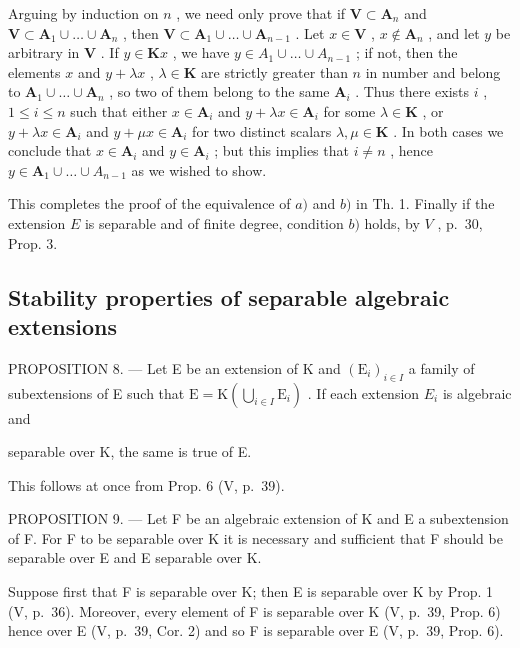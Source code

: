 Arguing by induction on \(n\) , we need only prove that if \(\mathbf{V} \subset \mathbf{A}_n\) and \(\mathbf{V} \subset \mathbf{A}_1 \cup \ldots \cup \mathbf{A}_n\) , then \(\mathbf{V} \subset \mathbf{A}_1 \cup \ldots \cup \mathbf{A}_{n-1}\) . Let \(x \in \mathbf{V}\) , \(x \notin \mathbf{A}_n\) , and let \(y\) be arbitrary in \(\mathbf{V}\) . If \(y \in \mathbf{K}x\) , we have \(y \in A_1 \cup \ldots \cup A_{n-1}\) ; if not, then the elements \(x\) and \(y + \lambda x\) , \(\lambda \in \mathbf{K}\) are strictly greater than \(n\) in number and belong to \(\mathbf{A}_1 \cup \ldots \cup \mathbf{A}_n\) , so two of them belong to the same \(\mathbf{A}_i\) . Thus there exists \(i\) , \(1 \leqslant i \leqslant n\) such that either \(x \in \mathbf{A}_i\) and \(y + \lambda x \in \mathbf{A}_i\) for some \(\lambda \in \mathbf{K}\) , or \(y + \lambda x \in \mathbf{A}_i\) and \(y + \mu x \in \mathbf{A}_i\) for two distinct scalars \(\lambda, \mu \in \mathbf{K}\) . In both cases we conclude that \(x \in \mathbf{A}_i\) and \(y \in \mathbf{A}_i\) ; but this implies that \(i \neq n\) , hence \(y \in \mathbf{A}_1 \cup \ldots \cup A_{n-1}\) as we wished to show.

This completes the proof of the equivalence of \(a)\) and \(b)\) in Th. 1. Finally if the extension \(E\) is separable and of finite degree, condition \(b)\) holds, by \(V\) , p.~30, Prop. 3.

\subsection{Stability properties of separable algebraic extensions}

PROPOSITION 8. --- Let E be an extension of K and \((\mathrm{E}_{i})_{i\in I}\) a family of subextensions of E such that \(\mathrm{E}=\mathrm{K}\left(\bigcup_{i\in I}\mathrm{E}_{i}\right)\) . If each extension \(E_{i}\) is algebraic and

separable over K, the same is true of E.

This follows at once from Prop. 6 (V, p.~39).

PROPOSITION 9. --- Let F be an algebraic extension of K and E a subextension of F. For F to be separable over K it is necessary and sufficient that F should be separable over E and E separable over K.

Suppose first that F is separable over K; then E is separable over K by Prop. 1 (V, p.~36). Moreover, every element of F is separable over K (V, p.~39, Prop. 6) hence over E (V, p.~39, Cor. 2) and so F is separable over E (V, p.~39, Prop. 6).

